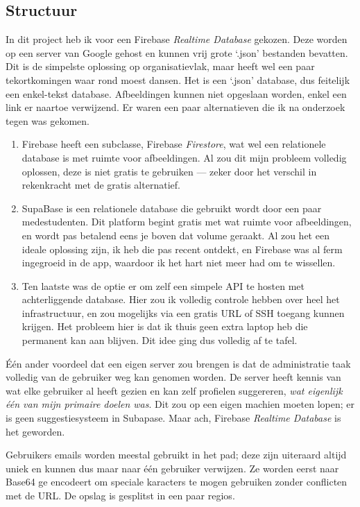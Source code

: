 \documentclass{report}
\begin{document}
\subsection{Structuur}
In dit project heb ik voor een Firebase \textit{Realtime Database} gekozen. Deze worden op een server van Google gehost en kunnen vrij grote `.json' bestanden bevatten.
Dit is de simpelste oplossing op organisatievlak, maar heeft wel een paar tekortkomingen waar rond moest dansen.
Het is een `.json' database, dus feitelijk een enkel-tekst database. Afbeeldingen kunnen niet opgeslaan worden, enkel een link er naartoe verwijzend.
Er waren een paar alternatieven die ik na onderzoek tegen was gekomen.
\begin{enumerate}
    \item Firebase heeft een subclasse, Firebase \textit{Firestore}, wat wel een relationele database is met ruimte voor afbeeldingen.
Al zou dit mijn probleem volledig oplossen, deze is niet gratis te gebruiken --- zeker door het verschil in rekenkracht met de gratis alternatief.
    \item SupaBase is een relationele database die gebruikt wordt door een paar medestudenten. Dit platform begint gratis met wat ruimte voor afbeeldingen, en wordt pas betalend eens je boven dat volume geraakt.
Al zou het een ideale oplossing zijn, ik heb die pas recent ontdekt, en Firebase was al ferm ingegroeid in de app, waardoor ik het hart niet meer had om te wissellen.
    \item Ten laatste was de optie er om zelf een simpele API te hosten met achterliggende database.
Hier zou ik volledig controle hebben over heel het infrastructuur, en zou mogelijks via een gratis URL of SSH toegang kunnen krijgen.
Het probleem hier is dat ik thuis geen extra laptop heb die permanent kan aan blijven. Dit idee ging dus volledig af te tafel.
\end{enumerate}
Één ander voordeel dat een eigen server zou brengen is dat de administratie taak volledig van de gebruiker weg kan genomen worden.
De server heeft kennis van wat elke gebruiker al heeft gezien en kan zelf profielen suggereren, \textit{wat eigenlijk één van mijn primaire doelen was}.
Dit zou op een eigen machien moeten lopen; er is geen suggestiesysteem in Subapase.
Maar ach, Firebase \textit{Realtime Database} is het geworden.

Gebruikers emails worden meestal gebruikt in het pad; deze zijn uiteraard altijd uniek en kunnen dus maar naar één gebruiker verwijzen. 
Ze worden eerst naar Base64 ge encodeert om speciale karacters te mogen gebruiken zonder conflicten met de URL.
De opslag is gesplitst in een paar regios.
\end{document}
